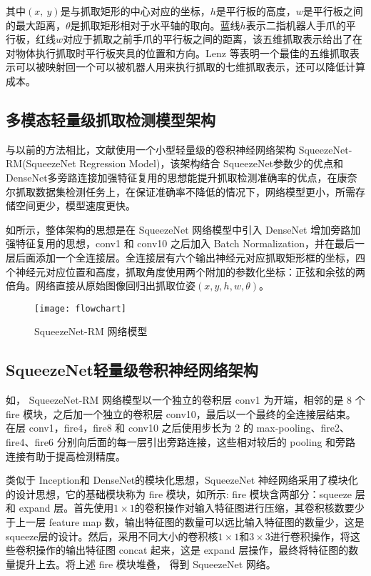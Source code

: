 \documentclass{yangthesis}
\begin{document}
其中$(x,\ y)$是与抓取矩形的中心对应的坐标，$h$是平行板的高度，$w$是平行板之间的最大距离，$\theta$是抓取矩形相对于水平轴的取向。蓝线$h$表示二指机器人手爪的平行板，红线$w$对应于抓取之前手爪的平行板之间的距离，该五维抓取表示给出了在对物体执行抓取时平行板夹具的位置和方向。Lenz 等表明一个最佳的五维抓取表示可以被映射回一个可以被机器人用来执行抓取的七维抓取表示，还可以降低计算成本。

\subsection{多模态轻量级抓取检测模型架构}

与以前的方法相比，文献\cite{bib:one}使用一个小型轻量级的卷积神经网络架构 SqueezeNet-RM(SqueezeNet Regression Model)，该架构结合 SqueezeNet参数少的优点和 DenseNet多旁路连接加强特征复用的思想能提升抓取检测准确率的优点，在康奈尔抓取数据集检测任务上，在保证准确率不降低的情况下，网络模型更小，所需存储空间更少，模型速度更快。

如所示，整体架构的思想是在 SqueezeNet 网络模型中引入 DenseNet 增加旁路加强特征复用的思想，conv1 和 conv10 之后加入 Batch Normalization，并在最后一层后面添加一个全连接层。全连接层有六个输出神经元对应抓取矩形框的坐标，四个神经元对应位置和高度，抓取角度使用两个附加的参数化坐标：正弦和余弦的两倍角。网络直接从原始图像回归出抓取位姿$(x,y,h,w,\theta)$。

\begin{figure}[!htbp]
	\centering
	\texttt{[image: flowchart]}
	\caption{SqueezeNet-RM 网络模型}
     \label{figflowchart}
\end{figure}

\subsection{SqueezeNet轻量级卷积神经网络架构}

如， SqueezeNet-RM 网络模型以一个独立的卷积层 conv1 为开端，相邻的是 8 个 f\/ire 模块，之后加一个独立的卷积层 conv10，最后以一个最终的全连接层结束。在层 conv1，f\/ire4，f\/ire8 和 conv10 之后使用步长为 2 的 max-pooling、f\/ire2、f\/ire4、f\/ire6 分别向后面的每一层引出旁路连接，这些相对较后的 pooling 和旁路连接有助于提高检测精度。 

类似于 Inception和 DenseNet的模块化思想，SqueezeNet 神经网络采用了模块化的设计思想，它的基础模块称为 f\/ire 模块，如所示:  f\/ire 模块含两部分：squeeze 层和 expand 层。首先使用$1\times1$的卷积操作对输入特征图进行压缩，其卷积核数要少于上一层 feature map 数，输出特征图的数量可以远比输入特征图的数量少，这是 squeeze层的设计。然后，采用不同大小的卷积核$1\times1$和$3\times3$进行卷积操作，将这些卷积操作的输出特征图 concat 起来，这是 expand 层操作，最终将特征图的数量提升上去。将上述 f\/ire 模块堆叠， 得到 SqueezeNet 网络。
\end{document}
